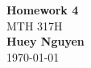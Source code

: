 \begin{titlepage}
    \begin{center}
    {\fontsize{40}{48}\selectfont \bfseries Homework 4} 
    \\\vspace{20pt}
    {\LARGE MTH 317H} \\
    \vspace{20pt}
    \textbf{Huey Nguyen}
    \vspace{8pt}
    \\\today
    \end{center}
\end{titlepage}